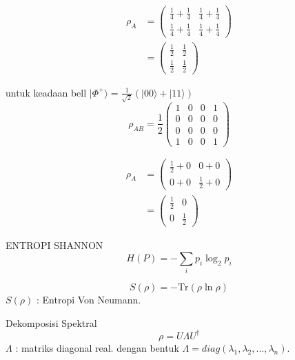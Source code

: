 \begin{equation}
    \begin{split}
    \rho_{A} &= \begin{pmatrix} \frac{1}{4} + \frac{1}{4} & \frac{1}{4} + \frac{1}{4} \\ \frac{1}{4} + \frac{1}{4} & \frac{1}{4} + \frac{1}{4} \end{pmatrix} \\
    &= \begin{pmatrix} \frac{1}{2} & \frac{1}{2} \\ \frac{1}{2} & \frac{1}{2} \end{pmatrix}
    \end{split}
\end{equation}

untuk keadaan bell $|\Phi^+\rangle = \frac{1}{\sqrt{2}} (|00\rangle + |11\rangle)$
\begin{equation}
    \rho_{AB} = \frac{1}{2} \begin{pmatrix} 1 & 0 & 0 & 1 \\ 0 & 0 & 0 & 0 \\ 0 & 0 & 0 & 0 \\ 1 & 0 & 0 & 1 \end{pmatrix}
\end{equation}

\begin{equation}
    \begin{split}
    \rho_{A} &= \begin{pmatrix} \frac{1}{2} + 0 & 0 + 0 \\ 0 + 0 & \frac{1}{2} + 0 \end{pmatrix} \\
    &= \begin{pmatrix} \frac{1}{2} & 0 \\ 0 & \frac{1}{2} \end{pmatrix}
    \end{split}
\end{equation}

ENTROPI SHANNON
\begin{equation}
    H(P) = -\sum_i p_i \log_2 p_i
\end{equation}

\begin{equation}
    S(\rho) = -\text{Tr}(\rho \ln \rho)
\end{equation}
$S(\rho)$ : Entropi Von Neumann.

Dekomposisi Spektral
\begin{equation}
    \rho = U \Lambda U^\dagger
\end{equation}
$\Lambda$ : matriks diagonal real. dengan bentuk $\Lambda = diag(\lambda_1, \lambda_2, ..., \lambda_n)$.

